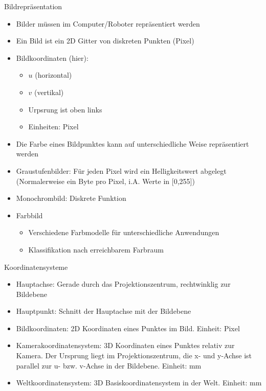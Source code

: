 \documentclass[paper=a4, fontsize=11pt]{scrartcl} %
\numberwithin{equation}{section} %
\numberwithin{figure}{section} %
\numberwithin{table}{section} %
\begin{document}
Bildrepräsentation
\begin{itemize}
\item Bilder müssen im Computer/Roboter repräsentiert werden
\item Ein Bild ist ein 2D Gitter von diskreten Punkten (Pixel)
\item Bildkoordinaten (hier):
\begin{itemize}
\item $u$ (horizontal)
\item $v$ (vertikal)
\item Urpsrung ist oben links
\item Einheiten: Pixel
\end{itemize}
\item Die Farbe eines Bildpunktes kann auf unterschiedliche Weise repräsentiert werden
\item Graustufenbilder: Für jeden Pixel wird ein Helligkeitswert abgelegt (Normalerweise ein Byte pro Pixel, i.A. Werte in [0,255])
\item Monochrombild: Diskrete Funktion
\item Farbbild
\begin{itemize}
\item Verschiedene Farbmodelle für unterschiedliche Anwendungen
\item Klassifikation nach erreichbarem Farbraum
\end{itemize}
\end{itemize}

Koordinatensysteme
\begin{itemize}
\item Hauptachse: Gerade durch das Projektionszentrum, rechtwinklig zur Bildebene
\item Hauptpunkt: Schnitt der Hauptachse mit der Bildebene
\item Bildkoordinaten: 2D Koordinaten eines Punktes im Bild. Einheit: Pixel
\item Kamerakoordinatensystem: 3D Koordinaten eines Punktes relativ zur Kamera. Der Ursprung liegt im Projektionszentrum, die x- und y-Achse ist parallel zur u- bzw. v-Achse in der Bildebene. Einheit: mm
\item Weltkoordinatensystem: 3D Basiskoordinatensystem in der Welt. Einheit: mm
\end{itemize}
\end{document}
